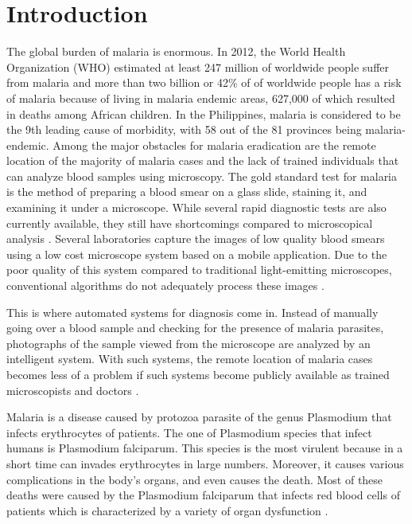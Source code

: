 \section{Introduction}
\label{intro}


The global burden of malaria is enormous. In 2012, the World Health Organization (WHO) estimated at least 247 million of worldwide people suffer from malaria and more than two billion or 42\% of of worldwide people has a risk of malaria because of living in malaria endemic areas, 627,000 of which resulted in deaths among African children. In the Philippines, malaria is considered to be the 9th leading cause of morbidity, with 58 out of the 81 provinces being malaria-endemic. Among the major obstacles for malaria eradication are the remote location of the majority of malaria cases and the lack of trained individuals that can analyze blood samples using
microscopy. The gold standard test for malaria is the method of preparing a blood smear on a glass slide, staining it, and examining it under a microscope. While several rapid diagnostic tests are also currently available, they still have shortcomings compared to microscopical analysis \cite{Quinn2016DeepDiagnostics}\cite{Premaratne2006AFilms}\cite{Penas2017}. Several laboratories capture the images of low quality blood smears using a low cost microscope system based on a mobile application. Due to the poor quality of this system compared to traditional light-emitting microscopes, conventional algorithms do not adequately process these images \cite{Sorgedrager2018}. 

This is where automated systems for diagnosis
come in. Instead of manually going over a blood sample and
checking for the presence of malaria parasites, photographs
of the sample viewed from the microscope are analyzed by
an intelligent system. With such systems, the remote location
of malaria cases becomes less of a problem if such systems
become publicly available as trained microscopists and doctors \cite{Premaratne2006AFilms}\cite{Penas2017}.

Malaria is a disease caused by protozoa parasite of the genus Plasmodium that infects erythrocytes of patients. The one of Plasmodium species that infect humans is Plasmodium falciparum. This species is the most virulent because in a short time can invades erythrocytes in large numbers. Moreover, it causes various complications in the body's organs, and even causes the death. Most of these deaths were caused by the Plasmodium falciparum that infects red blood cells of patients which is characterized by a variety of organ dysfunction \cite{Dong2017}.

